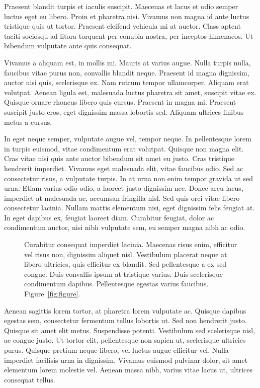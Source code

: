 \documentclass[]{aastex61}
\begin{document}
Praesent blandit turpis et iaculis suscipit. Maecenas et lacus et odio semper luctus eget eu libero. Proin et pharetra nisi. Vivamus non magna id ante luctus tristique quis ut tortor. Praesent eleifend vehicula mi at auctor. Class aptent taciti sociosqu ad litora torquent per conubia nostra, per inceptos himenaeos. Ut bibendum vulputate ante quis consequat.

Vivamus a aliquam est, in mollis mi. Mauris at varius augue. Nulla turpis nulla, faucibus vitae purus non, convallis blandit neque. Praesent id magna dignissim, auctor nisi quis, scelerisque ex. Nam rutrum tempor ullamcorper. Aliquam erat volutpat. Aenean ligula est, malesuada luctus pharetra sit amet, suscipit vitae ex. Quisque ornare rhoncus libero quis cursus. Praesent in magna mi. Praesent suscipit justo eros, eget dignissim massa lobortis sed. Aliquam ultrices finibus metus a cursus.

In eget neque semper, vulputate augue vel, tempor neque. In pellentesque lorem in turpis euismod, vitae condimentum erat volutpat. Quisque non magna elit. Cras vitae nisi quis ante auctor bibendum sit amet eu justo. Cras tristique hendrerit imperdiet. Vivamus eget malesuada elit, vitae faucibus odio. Sed ac consectetur risus, a vulputate turpis. In at urna non enim tempor gravida ut sed urna. Etiam varius odio odio, a laoreet justo dignissim nec. Donec arcu lacus, imperdiet at malesuada ac, accumsan fringilla nisl. Sed quis orci vitae libero consectetur lacinia. Nullam mattis elementum nisi, eget dignissim felis feugiat at. In eget dapibus ex, feugiat laoreet diam. Curabitur feugiat, dolor ac condimentum auctor, nisi nibh vulputate sem, eu semper magna nibh ac odio.

\begin{figure}[ht!]
\caption{Curabitur consequat imperdiet lacinia. Maecenas risus enim, efficitur vel risus non, dignissim aliquet nisl. Vestibulum placerat neque at libero ultricies, quis efficitur ex blandit. Sed pellentesque a ex sed congue. Duis convallis ipsum at tristique varius. Duis scelerisque condimentum dapibus. Pellentesque egestas varius faucibus. Figure~\ref{fig:figure}.}
\label{fig:figure2}
\end{figure}

Aenean sagittis lorem tortor, at pharetra lorem vulputate ac. Quisque dapibus egestas sem, consectetur fermentum tellus lobortis ut. Sed non hendrerit justo. Quisque sit amet elit metus. Suspendisse potenti. Vestibulum sed scelerisque nisl, ac congue justo. Ut tortor elit, pellentesque non sapien ut, scelerisque ultricies purus. Quisque pretium neque libero, vel luctus augue efficitur vel. Nulla imperdiet facilisis urna in dignissim. Vivamus euismod pulvinar dolor, sit amet elementum lorem molestie vel. Aenean massa nibh, varius vitae lacus ut, ultrices consequat tellus.
\end{document}
